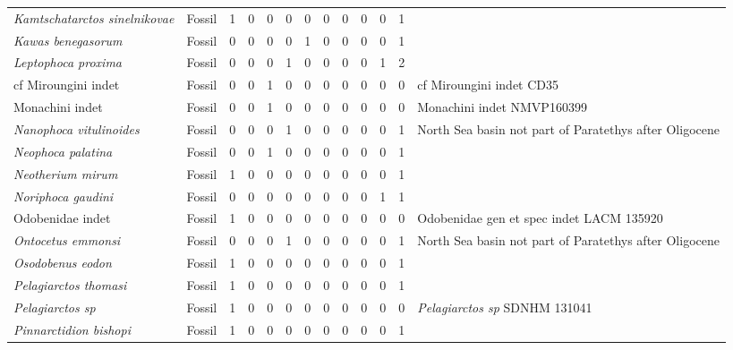 \begin{longtable}{llccccccccccp{}}
\textit{Kamtschatarctos sinelnikovae} &
Fossil &
1 &
0 &
0 &
0 &
0 &
0 &
0 &
0 &
0 &
1 &
\\

\textit{Kawas benegasorum} &
Fossil &
0 &
0 &
0 &
0 &
1 &
0 &
0 &
0 &
0 &
1 &
\\

\textit{Leptophoca proxima} &
Fossil &
0 &
0 &
0 &
1 &
0 &
0 &
0 &
0 &
1 &
2 &
\\

cf Miroungini indet &
Fossil &
0 &
0 &
1 &
0 &
0 &
0 &
0 &
0 &
0 &
0 &
cf Miroungini indet CD35\\

Monachini indet &
Fossil &
0 &
0 &
1 &
0 &
0 &
0 &
0 &
0 &
0 &
0 &
Monachini indet NMVP160399\\

\textit{Nanophoca vitulinoides} &
Fossil &
0 &
0 &
0 &
1 &
0 &
0 &
0 &
0 &
0 &
1 &
North Sea basin not part of Paratethys after Oligocene\\

\textit{Neophoca palatina} &
Fossil &
0 &
0 &
1 &
0 &
0 &
0 &
0 &
0 &
0 &
1 &
\\

\textit{Neotherium mirum} &
Fossil &
1 &
0 &
0 &
0 &
0 &
0 &
0 &
0 &
0 &
1 &
\\

\textit{Noriphoca gaudini} &
Fossil &
0 &
0 &
0 &
0 &
0 &
0 &
0 & 
0 &
1 &
1 &
\\

Odobenidae indet &
Fossil &
1 &
0 &
0 &
0 &
0 &
0 &
0 &
0 &
0 &
0 &
Odobenidae gen et spec indet LACM 135920\\

\textit{Ontocetus emmonsi} &
Fossil &
0 &
0 &
0 &
1 &
0 &
0 &
0 &
0 &
0 &
1 &
North Sea basin not part of Paratethys after Oligocene\\

\textit{Osodobenus eodon} &
Fossil &
1 &
0 &
0 &
0 &
0 &
0 &
0 &
0 &
0 &
1 &
\\

\textit{Pelagiarctos thomasi} &
Fossil &
1 &
0 &
0 &
0 &
0 &
0 &
0 &
0 &
0 &
1 &
\\

\textit{Pelagiarctos sp} &
Fossil &
1 &
0 &
0 &
0 &
0 &
0 &
0 &
0 &
0 &
0 &
\textit{Pelagiarctos sp} SDNHM 131041\\

\textit{Pinnarctidion bishopi} &
Fossil &
1 &
0 &
0 &
0 &
0 &
0 &
0 &
0 &
0 &
1 &
\\


\end{longtable}
